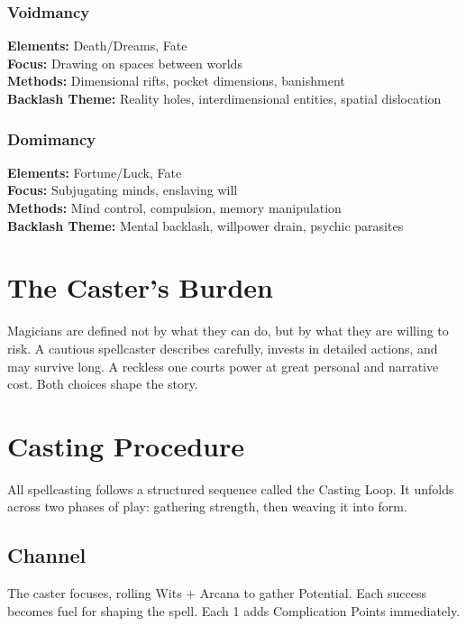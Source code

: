 \subsubsection{Voidmancy}
\textbf{Elements:} Death/Dreams, Fate\\
\textbf{Focus:} Drawing on spaces between worlds\\
\textbf{Methods:} Dimensional rifts, pocket dimensions, banishment\\
\textbf{Backlash Theme:} Reality holes, interdimensional entities, spatial dislocation

\subsubsection{Domimancy}
\textbf{Elements:} Fortune/Luck, Fate\\
\textbf{Focus:} Subjugating minds, enslaving will\\
\textbf{Methods:} Mind control, compulsion, memory manipulation\\
\textbf{Backlash Theme:} Mental backlash, willpower drain, psychic parasites

\section{The Caster's Burden}

Magicians are defined not by what they can do, but by what they are willing to risk. A cautious spellcaster describes carefully, invests in detailed actions, and may survive long. A reckless one courts power at great personal and narrative cost. Both choices shape the story.

\section{Casting Procedure}

All spellcasting follows a structured sequence called the Casting Loop. It unfolds across two phases of play: gathering strength, then weaving it into form.

\subsection{Channel}
The caster focuses, rolling Wits + Arcana to gather Potential. Each success becomes fuel for shaping the spell. Each 1 adds Complication Points immediately.

